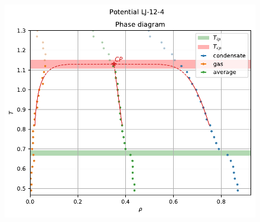 \documentclass[pdf,hyperref={unicode}]{beamer}
\begin{document}
\begin{frame}
\begin{columns}
\begin{column}{0.55\linewidth}
\begin{figure}[h]
\begin{center}
\begin{minipage}[h]{0.47\linewidth}
\includegraphics[width=\textwidth, keepaspectratio]{plot_phase_diagram_Potential LJ-12-4_1}
\end{minipage}


\end{center}
\end{figure}
\end{column}
\end{columns}
\end{frame}
\end{document}
